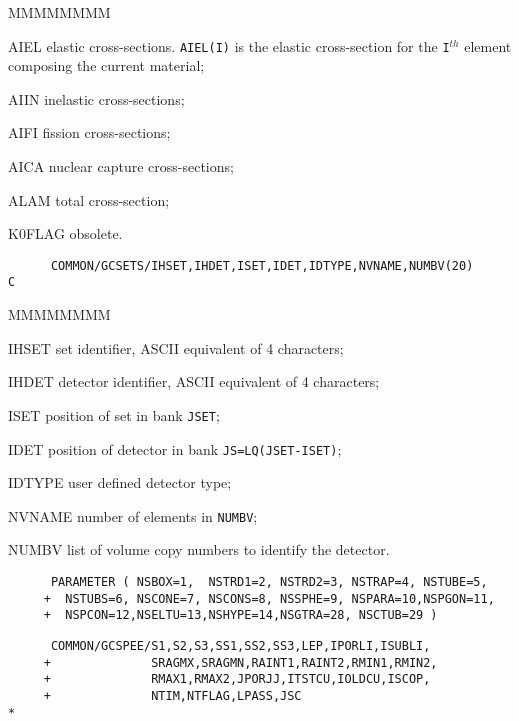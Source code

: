 \begin{DLtt}{MMMMMMMM}
\item[AIEL]elastic cross-sections. {\tt AIEL(I)} is the elastic cross-section
for the {\tt I}$^{th}$ element composing the current material;
\item[AIIN]   inelastic cross-sections;
\item[AIFI]   fission cross-sections;
\item[AICA]   nuclear capture cross-sections;
\item[ALAM]   total cross-section;
\item[K0FLAG] obsolete.
\end{DLtt}
\begin{verbatim}
      COMMON/GCSETS/IHSET,IHDET,ISET,IDET,IDTYPE,NVNAME,NUMBV(20)
C
\end{verbatim}
\begin{DLtt}{MMMMMMMM}
\item[IHSET]  set identifier, ASCII equivalent of 4 characters;
\item[IHDET]  detector identifier, ASCII equivalent of 4 characters;
\item[ISET]   position of set in bank {\tt JSET};
\item[IDET]   position of detector in bank {\tt JS=LQ(JSET-ISET)};
\item[IDTYPE] user defined detector type;
\item[NVNAME] number of elements in {\tt NUMBV};
\item[NUMBV]  list of volume copy numbers to identify the detector.
\end{DLtt}
\begin{verbatim}
      PARAMETER ( NSBOX=1,  NSTRD1=2, NSTRD2=3, NSTRAP=4, NSTUBE=5,
     +  NSTUBS=6, NSCONE=7, NSCONS=8, NSSPHE=9, NSPARA=10,NSPGON=11,
     +  NSPCON=12,NSELTU=13,NSHYPE=14,NSGTRA=28, NSCTUB=29 )
\end{verbatim}
\begin{verbatim}
      COMMON/GCSPEE/S1,S2,S3,SS1,SS2,SS3,LEP,IPORLI,ISUBLI,
     +              SRAGMX,SRAGMN,RAINT1,RAINT2,RMIN1,RMIN2,
     +              RMAX1,RMAX2,JPORJJ,ITSTCU,IOLDCU,ISCOP,
     +              NTIM,NTFLAG,LPASS,JSC
*
\end{verbatim}
